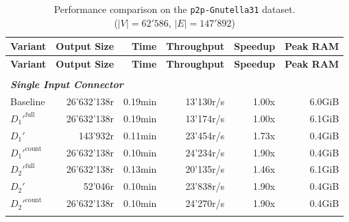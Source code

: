\begin{longtable}{lrrrrr}
    
    \caption[p2p-Gnutella31 Performance Comparison]{Performance comparison on the \texttt{p2p-Gnutella31} dataset. \\ ($|V| = 62'586$, $|E| = 147'892$)}
    \label{tab:results_ablation_p2p-Gnutella31} \\

    \toprule
    \textbf{Variant}      & \textbf{Output Size}  & \textbf{Time}       & \textbf{Throughput}   & \textbf{Speedup}  & \textbf{Peak RAM} \\
    \midrule
    \endfirsthead 

    \toprule
    \textbf{Variant}      & \textbf{Output Size}  & \textbf{Time}       & \textbf{Throughput}   & \textbf{Speedup}  & \textbf{Peak RAM} \\
    \midrule
    \endhead 

    \bottomrule
    \endfoot  

    \endlastfoot 

    
    \multicolumn{6}{l}{\textit{5 Path Query}} \\
    \midrule
    \multicolumn{6}{l}{\textit{\textbf{Single Input Connector}}} \\
    \nopagebreak
    Baseline              &  26'632'138r          &  0.19min        &  13'130r/s           & 1.00x             & 6.0GiB    \\
    $D_1'^{\text{full}}$   &  26'632'138r          &  0.19min        &  13'174r/s           & 1.00x             & 6.1GiB    \\
    \quad $D_1'$           &  143'932r             &  0.11min        &  23'454r/s           & 1.73x             & 0.4GiB    \\
    $D_1'^{\text{count}}$  &  26'632'138r          &  0.10min        &  24'234r/s           & 1.90x             & 0.4GiB    \\
    $D_2'^{\text{full}}$   &  26'632'138r          &  0.13min        &  20'135r/s           & 1.46x             & 6.1GiB    \\
    \quad $D_2'$           &  52'046r              &  0.10min        &  23'838r/s           & 1.90x             & 0.4GiB    \\
    $D_2'^{\text{count}}$  &  26'632'138r          &  0.10min        &  24'270r/s           & 1.90x             & 0.4GiB    \\
    \addlinespace
    

\end{longtable}
